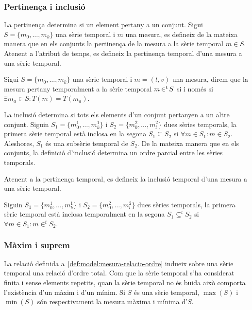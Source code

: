 \subsubsection{Pertinença i inclusió}

La pertinença determina si un element pertany a un conjunt.  Sigui
$S=\{m_0,\ldots,m_k\}$ una sèrie temporal i $m$ una mesura, es
defineix de la mateixa manera que en els conjunts la pertinença de la
mesura a la sèrie temporal $m \in S$. Atenent a l'atribut de temps, es
defineix la pertinença temporal d'una mesura a una sèrie temporal.
\begin{definition}
  Sigui $S=\{m_0,\ldots,m_k\}$ una sèrie temporal i $m=(t,v)$ una
  mesura, direm que la mesura pertany temporalment a la sèrie
  temporal $m \operatorname*{\in^t} S$ si i només si $\exists m_a \in S : T(m) =
  T(m_a)$.
\end{definition}


La inclusió determina si tots els elements d'un conjunt pertanyen a un
altre conjunt. Siguin $S_1=\{m_0^1,\ldots,m_k^1\}$ i
$S_2=\{m_0^2,\ldots,m_l^2\}$ dues sèries temporals, la primera sèrie
temporal està inclosa en la segona $S_1 \subseteq S_2$ si $\forall m
\in S_1: m \in S_2$. Aleshores, $S_1$ és una subsèrie temporal de
$S_2$. De la mateixa manera que en els conjunts, la definició
d'inclusió determina un ordre parcial entre les sèries temporals.

Atenent a la pertinença temporal, es defineix la inclusió temporal
d'una mesura a una sèrie temporal.
\begin{definition}
  Siguin $S_1=\{m_0^1,\ldots,m_k^1\}$ i $S_2=\{m_0^2,\ldots,m_l^2\}$
  dues sèries temporals, la primera sèrie temporal està inclosa
  temporalment en la segona $S_1 \subseteq^t S_2$ si $\forall m \in
  S_1: m \in^t S_2$.
\end{definition}


\subsubsection{Màxim i suprem}

La relació definida a~\ref{def:model:mesura-relacio-ordre} indueix
sobre una sèrie temporal una relació d'ordre total. Com que la sèrie
temporal s'ha considerat finita i sense elements repetits, quan la
sèrie temporal no és buida això comporta l'existència d'un màxim i
d'un mínim.  Si $S$ és una sèrie temporal, $\max(S)$ i $\min(S)$ són
respectivament la mesura màxima i mínima d'$S$.

